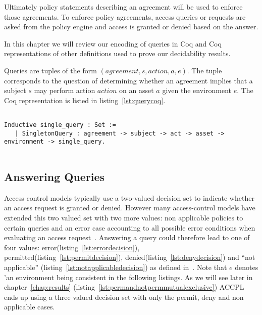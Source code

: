 Ultimately policy statements describing an agreement will be used to enforce those agreements. To enforce policy agreements, access queries or requests are asked from the policy engine and access is granted or denied based on the answer.

In this chapter we will review our encoding of queries in Coq and Coq representations of other definitions used to prove our decidability results.

Queries are tuples of the form $(agreement, s, action, a, e)$. The tuple corresponds to the question of determining whether an agreement implies that a subject $s$ may perform action $action$ on an asset $a$ given the environment $e$. The Coq representation is listed in listing~\ref{lst:querycoq}. 

\begin{minipage}[c]{0.95\textwidth}
\begin{lstlisting}

Inductive single_query : Set := 
   | SingletonQuery : agreement -> subject -> act -> asset -> environment -> single_query.
   
\end{lstlisting}
\end{minipage}

\subsection{Answering Queries}\label{subsec:answerqueriesodrl}

Access control models typically use a two-valued decision set to indicate whether an access request is granted or denied. However many access-control models have extended this two valued set with two more values: non applicable policies to certain queries and an error case accounting to all possible error conditions when evaluating an access request~\cite{DBLP:conf/sacmat/MorissetZ14}. Answering a query could therefore lead to one of four values: error(listing~\ref{lst:errordecision}), permitted(listing~\ref{lst:permitdecision}), denied(listing~\ref{lst:denydecision}) and ``not applicable'' (listing~\ref{lst:notapplicabledecision}) as defined in~\cite{Tschantz}. Note that $e$ denotes 'an environment being consistent in the following listings. As we will see later in chapter~\ref{chap:results} (listing~\ref{lst:permandnotpermmutualexclusive}) \ac{ACCPL} ends up using a three valued decision set with only the permit, deny and non applicable cases. 

